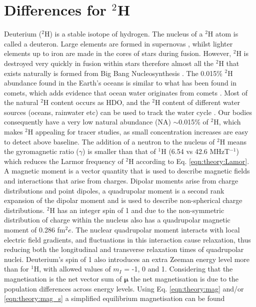 \section{Differences for \texorpdfstring{$^2$H}{2H}}

Deuterium ($^2$H) is a stable isotope of hydrogen. The nucleus of a $^2$H atom is called a deuteron. Large elements are formed in supernovas \cite{Watson2019IdentificationStars}, whilst lighter elements up to iron are made in the cores of stars during fusion. However, $^2$H is destroyed very quickly in fusion within stars \cite{Patrignani2016ReviewPhysics} therefore almost all the $^2$H that exists naturally is formed from Big Bang Nucleosynthesis \cite{Joseph2023GeologicalEarth}. The 0.015\% $^2$H abundance found in the Earth's oceans is similar to what has been found in comets, which adds evidence that ocean water originates from comets \cite{Hersant2001APlanets}. Most of the natural $^2$H content occurs as \ac{HDO}, and the $^2$H content of different water sources (oceans, rainwater etc) can be used to track the water cycle \cite{Bowen2019IsotopesApplications}. Our bodies consequently have a very low natural abundance (NA) $\sim$0.015\% of $^2$H, which makes $^2$H appealing for tracer studies, as small concentration increases are easy to detect above baseline. The addition of a neutron to the nucleus of $^2$H means the gyromagnetic ratio ($\gamma$) is smaller than that of $^1$H (6.54 vs 42.6 MHzT$^{-1}$) which reduces the Larmor frequency of $^2$H according to Eq. \ref{eqn:theory:Lamor}. A magnetic moment is a vector quantity that is used to describe magnetic fields and interactions that arise from charges. Dipolar moments arise from charge distributions and point dipoles, a quadrupolar moment is a second rank expansion of the dipolar moment and is used to describe non-spherical charge distributions. $^2$H has an integer spin of 1 and due to the non-symmetric distribution of charge within the nucleus also has a quadrupolar magnetic moment of 0.286 fm$^2e$. The nuclear quadrupolar moment interacts with local electric field gradients, and fluctuations in this interaction cause relaxation, thus reducing both the longitudinal and transverse relaxation times of quadrupolar nuclei. Deuterium's spin of 1 also introduces an extra Zeeman energy level more than for $^1$H, with allowed values of $m_I$ = -1, 0 and 1. Considering that the magnetisation is the net vector sum of $\mathbf{\mu}$ the net magnetisation is due to the population differences across energy levels. Using Eq. \ref{eqn:theory:mag} and/or \ref{eqn:theory:mag_s} a simplified equilibrium magnetisation can be found

